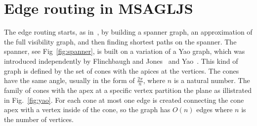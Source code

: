 \documentclass{gd-llncs}
\begin{document}
\section*{Edge routing in MSAGLJS}
The edge routing starts, as in~\cite{dwyer2010fast}, by building a spanner graph, an approximation of the full visibility graph, and then finding shortest paths on the spanner. The spanner, see Fig~\ref{fig:spanner}, is built on a variation of a Yao graph, which was introduced independently by Flinchbaugh and Jones~\cite{flinchbaugh1981strong}  and Yao~\cite{yao1982constructing}. This kind of graph is defined by the set of cones with the apices at the vertices. The cones have the same angle, 
usually in the form of $\frac{2\pi} {n}$, where $n$ is a natural number.  The family of cones with the apex at a specific vertex partition the plane as illistrated in Fig.~\ref{fig:yao}. For each cone at most one edge is created connecting the cone apex with a vertex inside of the cone, so the graph has $O(n)$ edges where $n$ is the number of vertices. \\
\end{document}

